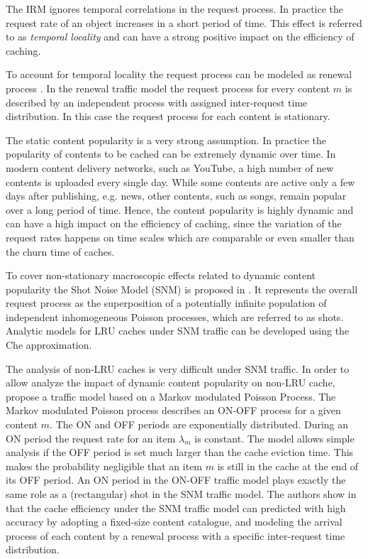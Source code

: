The IRM ignores temporal correlations in the request process.
In practice the request rate of an object increases in a short period of time.
This effect is referred to as \textit{temporal locality} and can have a strong positive impact on the efficiency of caching.

To account for temporal locality the request process can be modeled as renewal process \cite{martina2014unified}.
In the renewal traffic model the request process for every content $m$ is described by an independent process with assigned inter-request time distribution.
In this case the request process for each content is stationary.

The static content popularity is a very strong assumption.
In practice the popularity of contents to be cached can be extremely dynamic over time.
In modern content delivery networks, such as YouTube, a high number of new contents is uploaded every single day.
While some contents are active only a few days after publishing, e.g. news, other contents, such as songs, remain popular over a long period of time.
Hence, the content popularity is highly dynamic and can have a high impact on the efficiency of caching, since the variation of the request rates happens on time scales which are comparable or even smaller than the churn time of caches.

To cover non-stationary macroscopic effects related to dynamic content popularity the Shot Noise Model (SNM) is proposed in \cite{traverso2013temporal}.
It represents the overall request process as the superposition of a potentially infinite population of independent inhomogeneous Poisson processes, which are referred to as shots.
Analytic models for LRU caches under SNM traffic can be developed using the Che approximation.

The analysis of non-LRU caches is very difficult under SNM traffic.
In order to allow analyze the impact of dynamic content popularity on non-LRU cache, \cite{garetto2014dynamic} propose a traffic model based on a Markov modulated Poisson Process.
The Markov modulated Poisson process describes an ON-OFF process for a given content $m$.
The ON and OFF periods are exponentially distributed.
During an ON period the request rate for an item $\lambda_m$ is constant.
The model allows simple analysis if the OFF period is set much larger than the cache eviction time.
This makes the probability negligible that an item $m$ is still in the cache at the end of its OFF period.
An ON period in the ON-OFF traffic model plays exactly the same role as a (rectangular) shot in the SNM traffic model.
The authors show in \cite{garetto2014dynamic} that the cache efficiency under the SNM traffic model can predicted with high accuracy by adopting a fixed-size content catalogue, and modeling the arrival process of each content by a renewal process with a specific inter-request time distribution.

